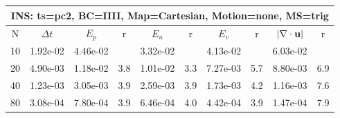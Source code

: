 
\begin{tabular}{|c|c|c|c|c|c|c|c|c|c|} \hline
 \multicolumn{10}{|c|}{INS: ts=pc2, BC=IIII, Map=Cartesian, Motion=none, MS=trig } \\ \hline 
     N  &   $\Delta t$ & $E_p$   &  r  &   $E_u$   &   r    &   $E_v$   & r   &  $|\nabla\cdot\mathbf{ u}|$  & r   \\ \hline 
  10   &  1.92e-02  &   4.46e-02  &        &   3.32e-02  &        &   4.13e-02  &        &   6.03e-02  &        \\ 
  20   &  4.90e-03  &   1.18e-02  & 3.8  &   1.01e-02  & 3.3  &   7.27e-03  & 5.7  &   8.80e-03  & 6.9  \\ 
  40   &  1.23e-03  &   3.05e-03  & 3.9  &   2.59e-03  & 3.9  &   1.73e-03  & 4.2  &   1.16e-03  & 7.6  \\ 
  80   &  3.08e-04  &   7.80e-04  & 3.9  &   6.46e-04  & 4.0  &   4.42e-04  & 3.9  &   1.47e-04  & 7.9  \\ 
 \hline 
\end{tabular}
